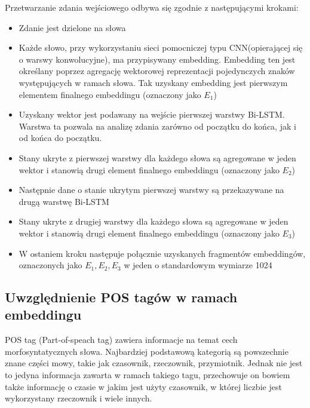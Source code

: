  

Przetwarzanie zdania wejściowego odbywa się zgodnie z następującymi krokami: 

\begin{itemize}
    \item Zdanie jest dzielone na słowa 
    \item Każde słowo, przy wykorzystaniu sieci pomocniczej typu CNN(opierającej się o warswy konwolucyjne), ma przypisywany embedding. Embedding ten jest określany poprzez agregację wektorowej reprezentacji pojedynczych znaków występujących w ramach słowa. Tak uzyskany embedding jest pierwszym elementem finalnego embeddingu (oznaczony jako $E_1$)
    \item Uzyskany wektor jest podawany na wejście pierwszej warstwy Bi-LSTM. Warstwa ta pozwala na analizę zdania zarówno od początku do końca, jak i od końca do początku. 
    \item  Stany ukryte z pierwszej warstwy dla każdego słowa są agregowane w jeden wektor i stanowią drugi element finalnego embeddingu (oznaczony jako $E_2$) 
    \item Następnie dane o stanie ukrytym pierwszej warstwy są przekazywane na drugą warstwę Bi-LSTM 
    \item Stany ukryte z drugiej warstwy dla każdego słowa są agregowane w jeden wektor i stanowią drugi element finalnego embeddingu (oznaczony jako $E_3$) 
    \item W ostaniem kroku następuje połącznie uzyskanych fragmentów embeddingów, oznaczonych jako $E_1,E_2, E_3$ w jeden o standardowym wymiarze 1024 
\end{itemize}

 



\subsection{Uwzględnienie POS tagów w ramach embeddingu}


POS tag (Part-of-speach tag) zawiera informacje na temat cech morfosyntatycznych słowa. Najbardziej podstawową kategorią są powszechnie znane części mowy, takie jak czasownik, rzeczownik, przymiotnik. Jednak nie jest to jedyna informacja zawarta w ramach takiego tagu, przechowuje on bowiem także informację o czasie w jakim jest użyty czasownik, w której liczbie jest wykorzystany rzeczownik i wiele innych.  

